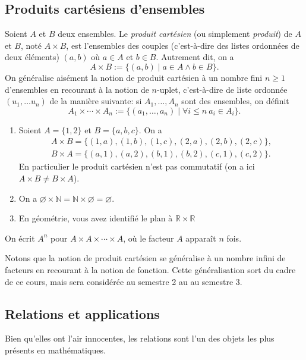 \documentclass[french,course,oneside,theoremnosection]{lecture}
\newcommand{\R}{\mathbb{R}}
\newcommand{\N}{\mathbb{N}}
\begin{document}
\subsection{Produits cartésiens d'ensembles}
\begin{definition}
Soient $A$ et $B$ deux ensembles. Le \emph{produit cartésien} (ou simplement \emph{produit}) de $A$ et $B$, noté $A\times B$, est l'ensembles des couples (c'est-à-dire des listes ordonnées de deux éléments) $(a,b)$ où $a\in A$ et $b\in B$. Autrement dit, on a
\[
A \times B :=\{(a,b) \mid a \in A \wedge b \in B\}.
\]
On généralise aisément la notion de produit cartésien à un nombre fini $n\geq 1$ d'ensembles en recourant à la notion de $n$-uplet, c'est-à-dire de liste ordonnée $(u_1, \ldots u_n)$ de la manière suivante: si $A_1, \ldots, A_n$ sont des ensembles, on définit
\[
A_1 \times \cdots \times A_n :=\{(a_1, \ldots, a_n) \mid \forall i \leq n \ a_i \in A_i\}.
\]
\end{definition}
\begin{example}
\begin{enumerate}[(1)]
\item Soient $A=\{1,2\}$ et $B=\{a, b, c\}$. On a
\begin{gather*}
A \times B =\{(1,a), (1,b), (1,c), (2,a), (2,b), (2,c)\},\\
B\times A = \{(a, 1), (a, 2), (b, 1), (b, 2), (c, 1), (c, 2)\}.
\end{gather*}
En particulier le produit cartésien n'est pas commutatif (on a ici $A \times B \neq B \times A$).
\item On a $\varnothing \times \N = \N \times \varnothing = \varnothing.$
\item En géométrie, vous avez identifié le plan à $\R \times \R$
\end{enumerate}
\end{example}

\begin{notation}
On écrit $A^n$ pour $A\times A \times \cdots \times A$, où le facteur $A$ apparaît $n$ fois.
\end{notation}
Notons que la notion de produit cartésien se généralise à un nombre infini de facteurs en recourant à la notion de fonction. Cette généralisation sort du cadre de ce cours, mais sera considérée au semestre 2 au au semestre 3.

\subsection{Relations et applications}
Bien qu'elles ont l'air innocentes, les relations sont l'un des objets les plus présents en mathématiques.
\end{document}
